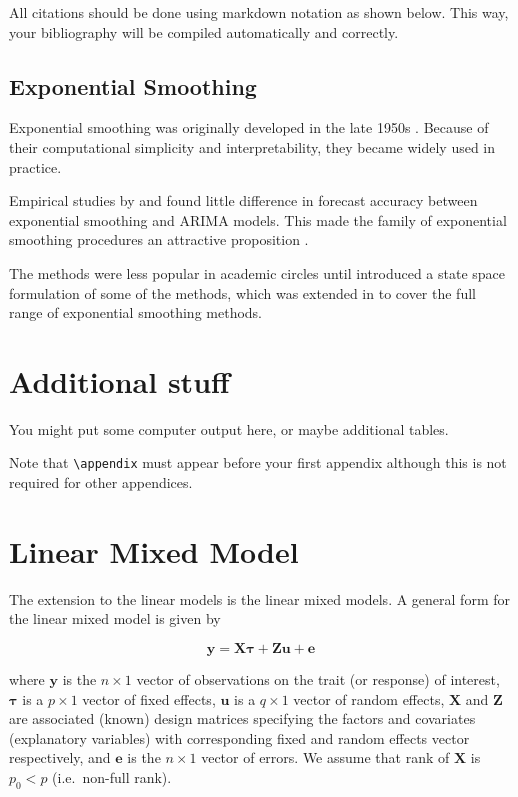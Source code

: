 \documentclass{sydneythesis}
\theoremstyle{definition}
\theoremstyle{definition}
\theoremstyle{definition}
\theoremstyle{remark}
\begin{document}
All citations should be done using markdown notation as shown below.
This way, your bibliography will be compiled automatically and
correctly.

\section{Exponential Smoothing}\label{sec:expsmooth}

Exponential smoothing was originally developed in the late 1950s
\autocites{Brown59}{Brown63}{Holt57}{Winters60}. Because of their
computational simplicity and interpretability, they became widely used
in practice.

Empirical studies by \textcite{MH79} and \textcite{Metal82} found little
difference in forecast accuracy between exponential smoothing and ARIMA
models. This made the family of exponential smoothing procedures an
attractive proposition \autocite[see][]{CKOS01}.

The methods were less popular in academic circles until \textcite{OKS97}
introduced a state space formulation of some of the methods, which was
extended in \textcite{HKSG02} to cover the full range of exponential
smoothing methods.

\appendix

\chapter{Additional stuff}\label{additional-stuff}

You might put some computer output here, or maybe additional tables.

Note that \texttt{\textbackslash{}appendix} must appear before your
first appendix although this is not required for other appendices.

\chapter{Linear Mixed Model}\label{lmm}

The extension to the linear models is the linear mixed models. A general
form for the linear mixed model is given by

\begin{equation}
\boldsymbol{y} = \boldsymbol{X}\boldsymbol{\tau} + \boldsymbol{Z}\boldsymbol{u} + \boldsymbol{e} \label{eq:lmm}
\end{equation}

where \(\boldsymbol{y}\) is the \(n\times 1\) vector of observations on
the trait (or response) of interest, \(\boldsymbol{\tau}\) is a
\(p \times 1\) vector of fixed effects, \(\boldsymbol{u}\) is a
\(q \times 1\) vector of random effects, \(\boldsymbol{X}\) and
\(\boldsymbol{Z}\) are associated (known) design matrices specifying the
factors and covariates (explanatory variables) with corresponding fixed
and random effects vector respectively, and \(\boldsymbol{e}\) is the
\(n\times 1\) vector of errors. We assume that rank of
\(\boldsymbol{X}\) is \(p_0 < p\) (i.e.~non-full rank).
\end{document}
